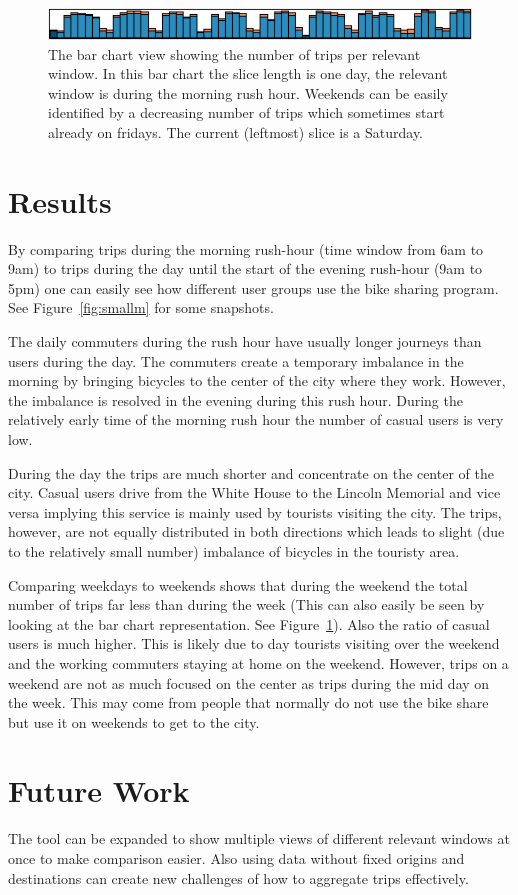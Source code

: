 \begin{figure}[h]
\centering
\includegraphics[width=\linewidth]{images/barchart.png}
\caption{The bar chart view showing the number of trips per relevant
window.
In this bar chart the slice length is one day, the relevant window is
during the morning rush hour.
Weekends can be easily identified by a decreasing number of trips
which sometimes start already on fridays.
The current (leftmost) slice is a Saturday.}
\label{fig:bar}
\end{figure}

\section{Results}
\label{sec:result}
By comparing trips during the morning rush-hour (time window from
6am to 9am) to trips during the day until the start of
the evening rush-hour (9am to 5pm) one can easily see
how different user groups use the bike sharing program.
See Figure~\ref{fig:smallm} for some snapshots.

The daily commuters during the rush hour have usually longer
journeys than users during the day. The commuters create
a temporary imbalance in the morning by bringing bicycles
to the center of the city where they work. However, the imbalance is
resolved in the evening during this rush hour. During the relatively
early time of the morning rush hour the number of casual users
is very low.

During the day the trips are much shorter and concentrate on the
center of the city. Casual users drive from the White House to
the Lincoln Memorial and vice versa implying this service is mainly
used by tourists visiting the city. The trips, however, are not
equally distributed in both directions which leads to slight (due to
the relatively small number) imbalance of bicycles in the touristy
area.

Comparing weekdays to weekends shows that during the weekend
the total number of trips far less than during the week (This can also
easily be seen by looking at the bar chart representation. See Figure~\ref{fig:bar}).
Also the ratio of casual users is much higher.
This is likely due to day tourists visiting over the weekend
and the working commuters staying at home on the weekend.
However, trips on a weekend are not as much focused on the center
as trips during the mid day on the week.
This may come from
people that normally do not use the bike share but use it on
weekends to get to the city.

\section{Future Work}
The tool can be expanded to show multiple views of different
relevant windows at once to make comparison easier.
Also using data without fixed origins and destinations
can create new challenges of how to aggregate trips
effectively.
